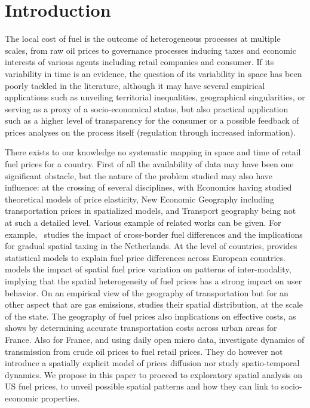 \documentclass[3p,times,procedia]{elsarticle}
\begin{document}




\section{Introduction}
\label{main}

The local cost of fuel is the outcome of heterogeneous processes at multiple scales, from raw oil prices to governance processes inducing taxes and economic interests of various agents including retail companies and consumer. If its variability in time is an evidence, the question of its variability in space has been poorly tackled in the literature, although it may have several empirical applications such as unveiling territorial inequalities, geographical singularities, or serving as a proxy of a socio-economical status, but also practical application such as a higher level of transparency for the consumer or a possible feedback of prices analyses on the process itself (regulation through increased information).

There exists to our knowledge no systematic mapping in space and time of retail fuel prices for a country. First of all the availability of data may have been one significant obstacle, but the nature of the problem studied may also have influence: at the crossing of several disciplines, with Economics having studied theoretical models of price elasticity, New Economic Geography including transportation prices in spatialized models, and Transport geography being not at such a detailed level. Various example of related works can be given. For example,~\cite{rietveld2001spatial} studies the impact of cross-border fuel differences and the implications for gradual spatial taxing in the Netherlands. At the level of countries, \cite{rietveld2005fuel} provides statistical models to explain fuel price differences across European countries. \cite{macharis2010decision} models the impact of spatial fuel price variation on patterns of inter-modality, implying that the spatial heterogeneity of fuel prices has a strong impact on user behavior. On an empirical view of the geography of transportation but for an other aspect that are gas emissions, \cite{gregg2009temporal} studies their spatial distribution, at the scale of the state. The geography of fuel prices also implications on effective costs, as shows \cite{combes2005transport} by determining accurate transportation costs across urban areas for France. Also for France, and using daily open micro data, \cite{gautier2015dynamics} investigate dynamics of transmission from crude oil prices to fuel retail prices. They do however not introduce a spatially explicit model of prices diffusion nor study spatio-temporal dynamics. We propose in this paper to proceed to exploratory spatial analysis on US fuel prices, to unveil possible spatial patterns and how they can link to socio-economic properties.
\end{document}
